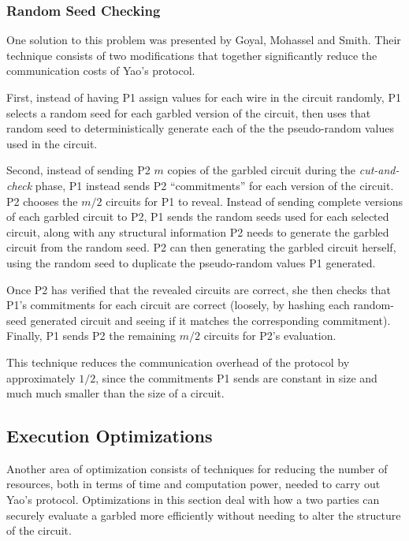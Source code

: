\subsubsection{Random Seed Checking}
\label{sec:randomseed}

One solution to this problem was presented by Goyal, Mohassel and Smith\cite{goyal2008efficient}. Their technique consists of two modifications that together significantly reduce the communication costs of Yao's protocol.

First, instead of having \ac{P1} assign values for each wire in the circuit randomly, \ac{P1} selects a random seed for each garbled version of the circuit, then uses that random seed to deterministically generate each of the the pseudo-random values used in the circuit.

Second, instead of sending \ac{P2} $m$ copies of the garbled circuit during the \emph{cut-and-check} phase, \ac{P1} instead sends \ac{P2} ``commitments'' for each version of the circuit.  \ac{P2} chooses the $m/2$ circuits for \ac{P1} to reveal.  Instead of sending complete versions of each garbled circuit to \ac{P2}, \ac{P1} sends the random seeds used for each selected circuit, along with any structural information \ac{P2} needs to generate the garbled circuit from the random seed. \ac{P2} can then generating the garbled circuit herself, using the random seed to duplicate the pseudo-random values \ac{P1} generated.

Once \ac{P2} has verified that the revealed circuits are correct, she then checks that \ac{P1}'s commitments for each circuit are correct (loosely, by hashing each random-seed generated circuit and seeing if it matches the corresponding commitment).  Finally, \ac{P1} sends \ac{P2} the remaining $m/2$ circuits for \ac{P2}'s evaluation.

This technique reduces the communication overhead of the protocol by approximately $1/2$, since the commitments \ac{P1} sends are constant in size and much much smaller than the size of a circuit.


\subsection{Execution Optimizations}

Another area of optimization consists of techniques for reducing the number of resources, both in terms of time and computation power, needed to carry out Yao's protocol.  Optimizations in this section deal with how a two parties can securely evaluate a garbled more efficiently without needing to alter the structure of the circuit.


